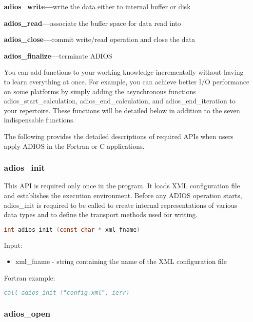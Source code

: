 \textbf{adios\_write---}write the data either to internal buffer or disk

\textbf{adios\_read---}associate the buffer space for data read into

\textbf{adios\_close---}commit write/read operation and close the data

\textbf{adios\_finalize---}terminate ADIOS

You can add functions to your working knowledge incrementally without having to 
learn everything at once. For example, you can achieve better I/O performance on 
some platforms by simply adding the asynchronous functions adios\_start\_calculation, 
adios\_end\_calculation, and adios\_end\_iteration to your repertoire. These functions 
will be detailed below in addition to the seven indispensable functions.

The following provides the detailed descriptions of required APIs when users apply 
ADIOS in the Fortran or C applications.

\subsubsection{adios\_init}

This API is required only once in the program. It loads XML configuration file 
and establishes the execution environment. Before any ADIOS operation starts, adios\_init 
is required to be called to create internal representations of various data types 
and to define the transport methods used for writing. 

\begin{lstlisting}[language=C]
int adios_init (const char * xml_fname)
\end{lstlisting}

Input: 
\begin{itemize}
\item xml\_fname - string containing the name of the XML configuration file
\end{itemize}

Fortran example: 
\begin{lstlisting}[language=Fortran]
call adios_init ("config.xml", ierr)
\end{lstlisting}

\subsubsection{adios\_open}

